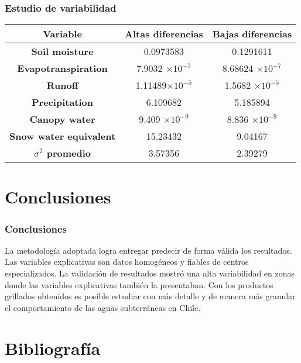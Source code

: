 \documentclass{beamer}
\begin{document}
  \begin{frame}
    \frametitle{Estudio de variabilidad}
    \centering
    \begin{tabular}{|c|c|c|}
      \hline
      \textbf{Variable}	& \textbf{Altas diferencias}	& \textbf{Bajas diferencias} \\
      \hline
      \textbf{Soil moisture}		         & 0.0973583                  & 0.1291611\\
      \textbf{Evapotranspiration}	       & 7.9032 $\times 10^{-7}$    & 8.68624 $\times 10^{-7}$\\
      \textbf{Runoff}		                 & 1.11489$\times 10^{-5}$    & 1.5682 $\times 10^{-5}$  \\
      \textbf{Precipitation}		         & 6.109682                   & 5.185894\\
      \textbf{Canopy water}		           & 9.409  $\times 10^{-9}$    & 8.836  $\times 10^{-9}$\\
      \textbf{Snow water equivalent}	   & 15.23432                   & 9.04167 \\
      \hline
      \textbf{$\sigma^2$ promedio}         & 3.57356                    & 2.39279\\
      \hline
    \end{tabular}
  \end{frame}

  \section*{Conclusiones}

  \begin{frame}
    \frametitle{Conclusiones}

    \begin{outline}
      \1 La metodología adoptada logra entregar predecir de forma válida los resultados.
      \1 Las variables explicativas son datos homogéneos y fiables de centros especializados.
      \1 La validación de resultados mostró una alta variabilidad en zonas donde las variables explicativas también la presentaban.
      \1 Con los productos grillados obtenidos es posible estudiar con más detalle y de manera más granular el comportamiento
      de las aguas subterráneas en Chile.
      
    \end{outline}
  \end{frame}

  \section*{Bibliografía}
\end{document}
